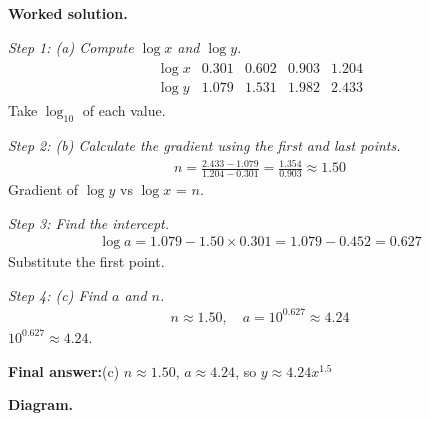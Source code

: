 \documentclass[11pt]{article}
\begin{document}
\textbf{Worked solution.}

\textit{Step 1: (a) Compute \( \log x \) and \( \log y \).}
\[\begin{gathered}
\begin{array}{c|c|c|c|c} \log x & 0.301 & 0.602 & 0.903 & 1.204 \\ \log y & 1.079 & 1.531 & 1.982 & 2.433 \end{array}
\end{gathered}\]
Take \( \log_{10} \) of each value.

\textit{Step 2: (b) Calculate the gradient using the first and last points.}
\[\begin{gathered}
n = \frac{2.433 - 1.079}{1.204 - 0.301} = \frac{1.354}{0.903} \approx 1.50
\end{gathered}\]
Gradient of \( \log y \) vs \( \log x \) = \( n \).

\textit{Step 3: Find the intercept.}
\[\begin{gathered}
\log a = 1.079 - 1.50 \times 0.301 = 1.079 - 0.452 = 0.627
\end{gathered}\]
Substitute the first point.

\textit{Step 4: (c) Find \( a \) and \( n \).}
\[\begin{gathered}
n \approx 1.50, \quad a = 10^{0.627} \approx 4.24
\end{gathered}\]
\( 10^{0.627} \approx 4.24 \).

\begin{answerbox}
\textbf{Final answer:}\quad (c) \(\displaystyle  n \approx 1.50 \), \(\displaystyle  a \approx 4.24 \), so \(\displaystyle  y \approx 4.24x^{1.5} \)
\end{answerbox}
\textbf{Diagram.}
\end{document}
